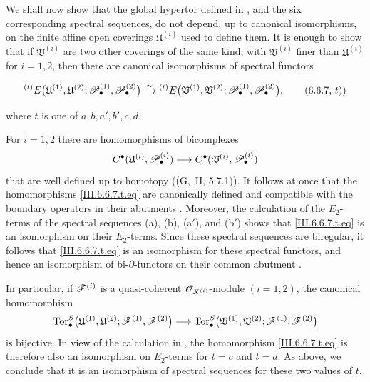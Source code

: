 \begin{env}[6.6.7]
\label{III.6.6.7}
We shall now show that the global hypertor defined in
, and the six corresponding spectral sequences,
do not depend, up to canonical isomorphisms, on the finite affine
open coverings $\mathfrak U^{(i)}$ used to define them.  It is
enough to show that if $\mathfrak V^{(i)}$ are two other
coverings of the same kind, with $\mathfrak V^{(i)}$ finer than
$\mathfrak U^{(i)}$ for $i=1,2$, then there are canonical
isomorphisms of spectral functors
\begin{env}[6.6.7, $t$]
\label{III.6.6.7.t}
\[
  {}^{(t)}E
  \bigl(
    \mathfrak U^{(1)},\mathfrak U^{(2)};
    \mathscr{P}_\bullet^{(1)},\mathscr{P}_\bullet^{(2)}
  \bigr)
  \xrightarrow{\sim}
  {}^{(t)}E
  \bigl(
    \mathfrak V^{(1)},\mathfrak V^{(2)};
    \mathscr{P}_\bullet^{(1)},\mathscr{P}_\bullet^{(2)}
  \bigr),
  \tag{6.6.7, $t$)}\label{III.6.6.7.t.eq}
\]
\end{env}
where $t$ is one of $a,b,a',b',c,d$.

For $i=1,2$ there are homomorphisms of bicomplexes
\[
  C^\bullet
  (\mathfrak U^{(i)},\mathscr{P}_\bullet^{(i)})
  \longrightarrow
  C^\bullet
  (\mathfrak V^{(i)},\mathscr{P}_\bullet^{(i)})
\]
that are well defined up to homotopy
((G,~II, 5.7.1)).  It follows at once that the
homomorphisms \eqref{III.6.6.7.t.eq} are canonically defined and
compatible with the boundary operators in their abutments
.  Moreover, the calculation of the
$E_2$-terms of the spectral sequences
\textnormal{(a)}, \textnormal{(b)}, \textnormal{(a$'$)}, and
\textnormal{(b$'$)} shows that
\eqref{III.6.6.7.t.eq} is an isomorphism on their $E_2$-terms.
Since these spectral sequences are biregular, it follows that
\eqref{III.6.6.7.t.eq} is an isomorphism for these spectral
functors, and hence an isomorphism of bi-$\partial$-functors on
their common abutment .

In particular, if $\mathscr{F}^{(i)}$ is a quasi-coherent
$\mathscr{O}_{X^{(i)}}$-module $(i=1,2)$, the canonical homomorphism
\[
  \operatorname{Tor}_\bullet^S
  \bigl(
    \mathfrak U^{(1)},\mathfrak U^{(2)};
    \mathscr{F}^{(1)},\mathscr{F}^{(2)}
  \bigr)
  \longrightarrow
  \operatorname{Tor}_\bullet^S
  \bigl(
    \mathfrak V^{(1)},\mathfrak V^{(2)};
    \mathscr{F}^{(1)},\mathscr{F}^{(2)}
  \bigr)
\]
is bijective.  In view of the calculation in
, the homomorphism
\eqref{III.6.6.7.t.eq} is therefore also an isomorphism on
$E_2$-terms for $t=c$ and $t=d$.  As above, we conclude that it
is an isomorphism of spectral sequences for these two values of
$t$.


\end{env}
